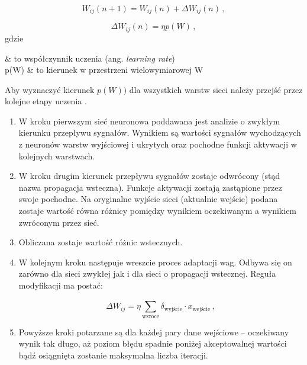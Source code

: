 \documentclass[twoside]{iisthesis}
\begin{document}
	 \begin{equation}
	 \label{eq:weightadaptation3}
	 W_{ij}(n+1) = W_{ij}(n) + \Delta W_{ij}(n) 
	 \,,
	 \end{equation}
	 
	 
	 \begin{equation}
	 \label{eq:weightadaptation2}
	 \Delta W_{ij}(n) = \eta p(W)
	 \,,
	 \end{equation}		 
	 gdzie
	 
	 \begin{conditions*}
			 	\eta & to współczynnik uczenia (ang. \textit{learning rate}) \\
			 	p(W) & to kierunek w przestrzeni wielowymiarowej W 
	 \end{conditions*} 
	 
	 Aby wyznaczyć kierunek $p(W))$ dla wszystkich warstw sieci należy przejść przez kolejne etapy uczenia \cite{haykin1994neural,hertz1993wstkep,kwateralgorytmy,osowski1996sieci,timothy1996sieci}.
	 
	 \begin{enumerate}
			 	\item W kroku pierwszym sieć neuronowa poddawana jest analizie o zwykłym kierunku przepływu sygnałów. Wynikiem są wartości sygnałów wychodzących z neuronów warstw wyjściowej i ukrytych oraz pochodne funkcji aktywacji w kolejnych warstwach. 
			 	
			 	\item W kroku drugim kierunek przepływu sygnałów zostaje odwrócony (stąd nazwa propagacja wsteczna). Funkcje aktywacji zostają zastąpione przez swoje pochodne. Na oryginalne wyjście sieci (aktualnie wejście) podana zostaje wartość równa różnicy pomiędzy wynikiem oczekiwanym a wynikiem zwróconym przez sieć. 
			 	
			 	\item Obliczana zostaje wartość różnic wstecznych.
			 	
			 	\item W kolejnym kroku następuje wreszcie proces adaptacji wag. Odbywa się on zarówno dla sieci zwykłej jak i dla sieci o propagacji wstecznej. Reguła modyfikacji ma postać: 
			 	
			 	\begin{equation}
			 	\label{eq:weightadaptation4}
			 	\Delta W_{ij} = \eta \sum_\text{wzroce}^{} \delta_\text{wyjście} \cdot x_\text{wejście}
			 	\,,
			 	\end{equation}
			 	
			 	\item Powyższe kroki potarzane są dla każdej pary dane wejściowe -- oczekiwany wynik tak długo, aż poziom błędu spadnie poniżej akceptowalnej wartości bądź osiągnięta zostanie maksymalna liczba iteracji. 
			 	
	 \end{enumerate}
	 
\end{document}
